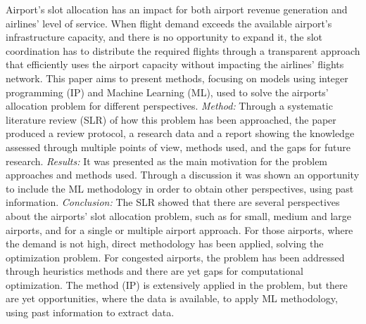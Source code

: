 Airport's slot allocation has an impact for both airport revenue generation and airlines' level of service. When flight demand exceeds the available airport's infrastructure capacity, and there is no opportunity to expand it, the slot coordination has to distribute the required flights through a transparent approach that efficiently uses the airport capacity without impacting the airlines' flights network. This paper aims to present methods, focusing on models using integer programming (IP) and Machine Learning (ML), used to solve the airports' allocation problem for different perspectives.
\textit{Method:} Through a systematic literature review (SLR) of how this problem has been approached, the paper produced a review protocol, a research data and a report showing the knowledge assessed through multiple points of view, methods used, and the gaps for future research.
\textit{Results:} It was presented as the main motivation for the problem approaches and methods used. Through a discussion it was shown an opportunity to include the ML methodology in order to obtain other perspectives, using past information.
\textit{Conclusion:} The SLR showed that there are several perspectives about the airports' slot allocation problem, such as for small, medium and large airports, and for a single or multiple airport approach. For those airports, where the demand is not high, direct methodology has been applied, solving the optimization problem. For congested airports, the problem has been addressed through heuristics methods and there are yet gaps for computational optimization. The method (IP) is extensively applied in the problem, but there are yet opportunities, where the data is available, to apply ML methodology, using past information to extract data.